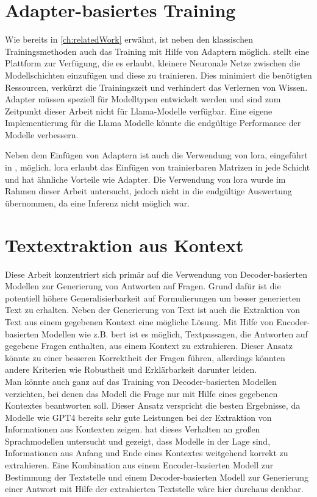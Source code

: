 \section{Adapter-basiertes Training}
Wie bereits in \cref{ch:relatedWork} erwähnt, ist neben den klassischen Trainingsmethoden auch das Training mit Hilfe von Adaptern möglich.
\citet{adapterhub} stellt eine Plattform zur Verfügung, die es erlaubt, kleinere Neuronale Netze zwischen die Modellschichten einzufügen und diese zu trainieren.
Dies minimiert die benötigten Ressourcen, verkürzt die Trainingszeit und verhindert das Verlernen von Wissen.
Adapter müssen speziell für Modelltypen entwickelt werden und sind zum Zeitpunkt dieser Arbeit nicht für Llama-Modelle verfügbar.
Eine eigene Implementierung für die Llama Modelle könnte die endgültige Performance der Modelle verbessern.

Neben dem Einfügen von Adaptern ist auch die Verwendung von \ac{lora}, eingeführt in \citet{lora}, möglich.
\ac{lora} erlaubt das Einfügen von trainierbaren Matrizen in jede Schicht und hat ähnliche Vorteile wie Adapter.
Die Verwendung von \ac{lora} wurde im Rahmen dieser Arbeit untersucht, jedoch nicht in die endgültige Auswertung übernommen, da eine Inferenz nicht möglich war.

\section{Textextraktion aus Kontext}
Diese Arbeit konzentriert sich primär auf die Verwendung von Decoder-basierten Modellen zur Generierung von Antworten auf Fragen.
Grund dafür ist die potentiell höhere Generalisierbarkeit auf Formulierungen um besser generierten Text zu erhalten.
Neben der Generierung von Text ist auch die Extraktion von Text aus einem gegebenen Kontext eine mögliche Lösung.
Mit Hilfe von Encoder-basierten Modellen wie z.B. \ac{bert} ist es möglich, Textpassagen, die Antworten auf gegebene Fragen enthalten, aus einem Kontext zu extrahieren.
Dieser Ansatz könnte zu einer besseren Korrektheit der Fragen führen, allerdings könnten andere Kriterien wie Robustheit und Erklärbarkeit darunter leiden.\\

Man könnte auch ganz auf das Training von Decoder-basierten Modellen verzichten, bei denen das Modell die Frage nur mit Hilfe eines gegebenen Kontextes beantworten soll.
Dieser Ansatz verspricht die besten Ergebnisse, da Modelle wie GPT4 bereits sehr gute Leistungen bei der Extraktion von Informationen aus Kontexten zeigen.
\citet{context-extract} hat dieses Verhalten an großen Sprachmodellen untersucht und gezeigt, dass Modelle in der Lage sind, Informationen aus Anfang und Ende eines Kontextes weitgehend korrekt zu extrahieren.
Eine Kombination aus einem Encoder-basierten Modell zur Bestimmung der Textstelle und einem Decoder-basierten Modell zur Generierung einer Antwort mit Hilfe der extrahierten Textstelle wäre hier durchaus denkbar.\\

